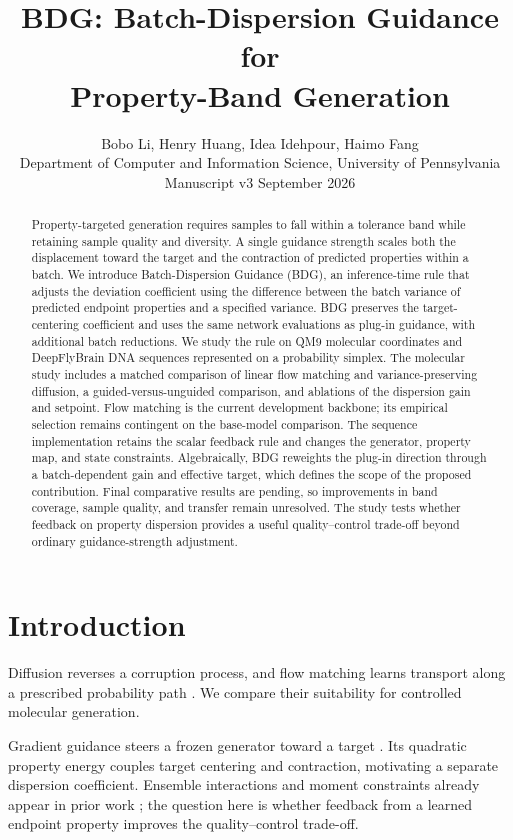 \documentclass{article}
\title{BDG: Batch-Dispersion Guidance for\\Property-Band Generation}
\author{Bobo Li, Henry Huang, Idea Idehpour, Haimo Fang\\
Department of Computer and Information Science, University of Pennsylvania\\
\small Manuscript v3 \quad 27 September 2026}
\begin{document}
\maketitle
\begin{abstract}
Property-targeted generation requires samples to fall within a tolerance band while retaining sample quality and diversity. A single guidance strength scales both the displacement toward the target and the contraction of predicted properties within a batch. We introduce Batch-Dispersion Guidance (BDG), an inference-time rule that adjusts the deviation coefficient using the difference between the batch variance of predicted endpoint properties and a specified variance. BDG preserves the target-centering coefficient and uses the same network evaluations as plug-in guidance, with additional batch reductions. We study the rule on QM9 molecular coordinates and DeepFlyBrain DNA sequences represented on a probability simplex. The molecular study includes a matched comparison of linear flow matching and variance-preserving diffusion, a guided-versus-unguided comparison, and ablations of the dispersion gain and setpoint. Flow matching is the current development backbone; its empirical selection remains contingent on the base-model comparison. The sequence implementation retains the scalar feedback rule and changes the generator, property map, and state constraints. Algebraically, BDG reweights the plug-in direction through a batch-dependent gain and effective target, which defines the scope of the proposed contribution. Final comparative results are pending, so improvements in band coverage, sample quality, and transfer remain unresolved. The study tests whether feedback on property dispersion provides a useful quality--control trade-off beyond ordinary guidance-strength adjustment.
\end{abstract}

\section{Introduction}
Diffusion reverses a corruption process, and flow matching learns transport along a prescribed probability path \citep{karras2022elucidating,lipman2022flow}. We compare their suitability for controlled molecular generation.

Gradient guidance steers a frozen generator toward a target \citep{chung2023dps,song2023lgd}. Its quadratic property energy couples target centering and contraction, motivating a separate dispersion coefficient. Ensemble interactions and moment constraints already appear in prior work \citep{corso2024particle,mgd2026moment}; the question here is whether feedback from a learned endpoint property improves the quality--control trade-off.
\end{document}
